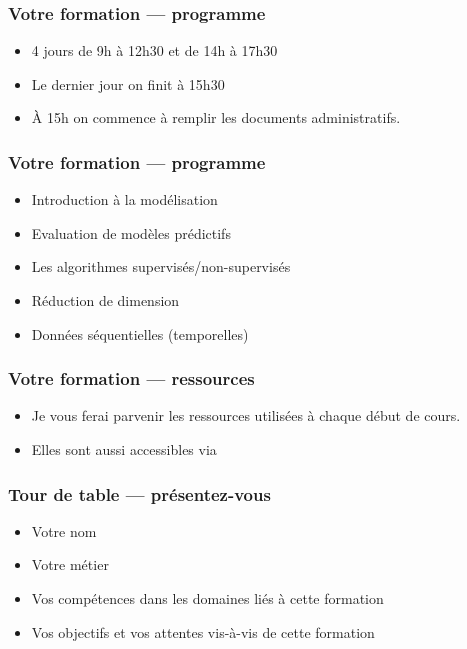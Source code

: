 \documentclass{formation}
\begin{document}
\begin{frame}
  \frametitle{Votre formation — programme}
  \begin{itemize}
  \item 4 jours de 9h à 12h30 et de 14h à 17h30
  \item Le dernier jour on finit à 15h30
  \item À 15h on commence à remplir les documents administratifs.
  \end{itemize}
\end{frame}

\begin{frame}
  \frametitle{Votre formation — programme}
  \begin{itemize}
  \item Introduction à la modélisation
  \item Evaluation de modèles prédictifs
  \item Les algorithmes supervisés/non-supervisés
  \item Réduction de dimension
  \item Données séquentielles (temporelles)
  \end{itemize}
\end{frame}

\begin{frame}
  \frametitle{Votre formation — ressources}
  \begin{itemize}
  \item Je vous ferai parvenir les ressources utilisées à chaque début de cours.
  \item Elles sont aussi accessibles via 
  \end{itemize}
\end{frame}

\begin{frame}
  \frametitle{Tour de table — présentez-vous}
  \begin{itemize}
  \item Votre nom
  \item Votre métier
  \item Vos compétences dans les domaines liés à cette formation
  \item Vos objectifs et vos attentes vis-à-vis de cette formation
  \end{itemize}
\end{frame}
\end{document}
